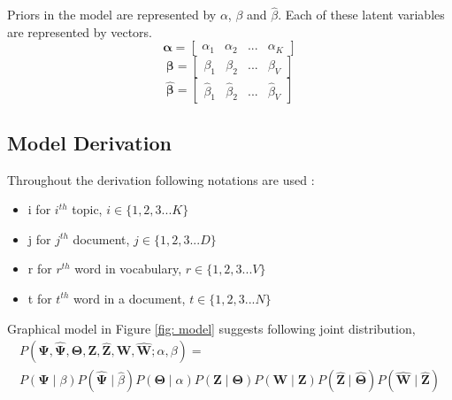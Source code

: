 \documentclass[a4paper]{article}
\begin{document}
Priors in the model are represented by $\alpha$, $\beta$ and $\hat{\beta}$. Each of these latent variables are represented by vectors. 
\[
\mathbf{\alpha} = \begin{bmatrix} \alpha_{1} & \alpha_{2} & ... & \alpha_{K} \end{bmatrix}
\]
\[
\mathbf{\beta} = \begin{bmatrix} \beta_{1} & \beta_{2} & ... & \beta_{V} \end{bmatrix}
\]
\[
\mathbf{\hat{\beta}} = \begin{bmatrix} \hat{\beta}_{1} & \hat{\beta}_{2} & ... & \hat{\beta}_{V} \end{bmatrix}
\]


\subsection{Model Derivation} \label{derivation}

Throughout the derivation following notations are used :
\begin{itemize}
\setlength{\itemsep}{0.5pt}
\item i for $i^{th}$ topic, $i \in \{1,2,3 ... K\}$
\item j for $j^{th}$ document, $j \in \{1,2,3 ... D\}$
\item r for $r^{th}$ word in vocabulary, $r \in \{1,2,3 ... V\}$
\item t for $t^{th}$ word in a document, $t \in \{1,2,3 ... N\}$
\end{itemize}

Graphical model in Figure \ref{fig: model} suggests following joint distribution,
\begin{multline}
P(\mathbf{\Psi}, \mathbf{\hat{\Psi}}, \mathbf{\Theta},  \mathbf{Z}, \mathbf{\hat{Z}}, \mathbf{W}, \mathbf{\hat{W}} ; \alpha, \beta) = \\
P(\mathbf{\Psi} \mid \beta) P(\mathbf{\hat{\Psi}} \mid \hat{\beta}) P(\mathbf{\Theta} \mid \alpha) P(\mathbf{Z} \mid \mathbf{\Theta})P(\mathbf{W} \mid \mathbf{Z}) P(\mathbf{\hat{Z}} \mid \mathbf{\hat{\Theta}}) P(\mathbf{\hat{W}} \mid \mathbf{\hat{Z}})
\end{multline}
\end{document}

